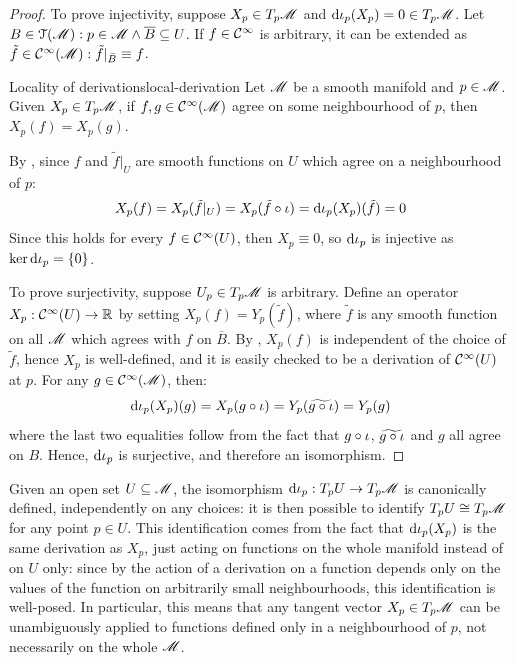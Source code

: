 \begin{proofbox}
  \begin{proof}
    To prove injectivity, suppose $ X_p \in T_p\mathscr{M} $ and $ \mathrm{d} \iota_p(X_p) = 0 \in T_p\mathscr{M} $. Let $ B \in \EuScript{T}(\mathscr{M}) : p \in \mathscr{M} \land \overline{B} \subseteq U $. If $ f \in \mathcal{C}^{\infty} $ is arbitrary, it can be extended as $ \tilde{f} \in \mathcal{C}^{\infty}(\mathscr{M}) : \tilde{f}\vert_{\bar{B}} \equiv f $.

    \begin{lemma}{Locality of derivations}{local-derivation}
      Let $ \mathscr{M} $ be a smooth manifold and $ p \in \mathscr{M} $. Given $ X_p \in T_p\mathscr{M} $, if $ f , g \in \mathcal{C}^{\infty}(\mathscr{M}) $ agree on some neighbourhood of $ p $, then $ X_p(f) = X_p(g) $.
    \end{lemma}

    By , since $ f $ and $ \tilde{f}\vert_U $ are smooth functions on $ U $ which agree on a neighbourhood of $ p $:
    \begin{equation*}
      X_p(f) = X_p(\tilde{f}\vert_U) = X_p(\tilde{f} \circ \iota) = \mathrm{d} \iota_p (X_p) (\tilde{f}) = 0
    \end{equation*}
    Since this holds for every $ f \in \mathcal{C}^{\infty}(U) $, then $ X_p \equiv 0 $, so $ \mathrm{d} \iota_p $ is injective as $ \ker \mathrm{d} \iota_p = \{0\} $.

    To prove surjectivity, suppose $ U_p \in T_p\mathscr{M} $ is arbitrary. Define an operator $ X_p : \mathcal{C}^{\infty}(U) \rightarrow \mathbb{R} $ by setting $ X_p(f) = Y_p(\tilde{f}) $, where $ \tilde{f} $ is any smooth function on all $ \mathscr{M} $ which agrees with $ f $ on $ \overline{B} $. By , $ X_p(f) $ is independent of the choice of $ \tilde{f} $, hence $ X_p $ is well-defined, and it is easily checked to be a derivation of $ \mathcal{C}^{\infty}(U) $ at $ p $. For any $ g \in \mathcal{C}^{\infty}(\mathscr{M}) $, then:
    \begin{equation*}
      \mathrm{d} \iota_p(X_p) (g) = X_p(g \circ \iota) = Y_p(\widetilde{g \circ \iota}) = Y_p(g)
    \end{equation*}
    where the last two equalities follow from the fact that $ g \circ \iota $, $ \widetilde{g \circ \iota} $ and $ g $ all agree on $ B $. Hence, $ \mathrm{d} \iota_p $ is surjective, and therefore an isomorphism.
  \end{proof}
\end{proofbox}

Given an open set $ U \subseteq \mathscr{M} $, the isomorphism $ \mathrm{d} \iota_p : T_pU \rightarrow T_p\mathscr{M} $ is canonically defined, independently on any choices: it is then possible to identify $ T_pU \cong T_p\mathscr{M} $ for any point $ p \in U $. This identification comes from the fact that $ \mathrm{d} \iota_p(X_p) $ is the same derivation as $ X_p $, just acting on functions on the whole manifold instead of on $ U $ only: since by  the action of a derivation on a function depends only on the values of the function on arbitrarily small neighbourhoods, this identification is well-posed. In particular, this means that any tangent vector $ X_p \in T_p\mathscr{M} $ can be unambiguously applied to functions defined only in a neighbourhood of $ p $, not necessarily on the whole $ \mathscr{M} $.

